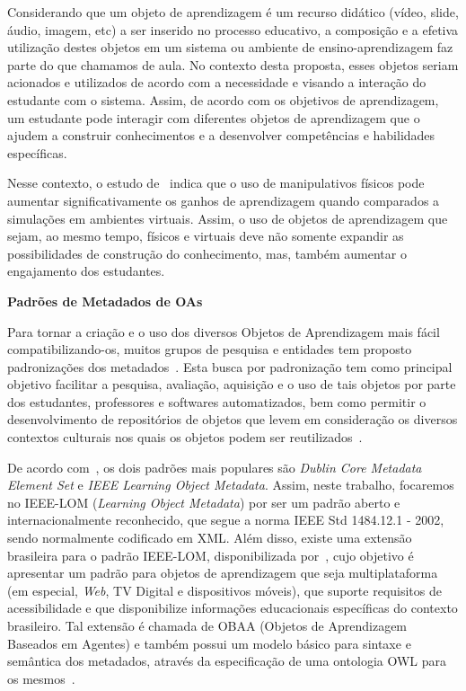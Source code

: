 Considerando que um objeto de aprendizagem é um recurso didático (vídeo, slide, áudio, imagem, etc) a ser inserido no processo educativo, a composição e a efetiva utilização destes objetos em um sistema ou ambiente de ensino-aprendizagem faz parte do que chamamos de aula. No contexto desta proposta, esses objetos seriam acionados e utilizados de acordo com a necessidade e visando a interação do estudante com o sistema. Assim, %
de acordo com os objetivos de aprendizagem, um estudante pode interagir com diferentes objetos de aprendizagem que o ajudem a construir conhecimentos e a desenvolver competências e habilidades específicas.

Nesse contexto, o estudo de~\cite{Salehi:2014} indica que o uso de manipulativos físicos pode aumentar significativamente os ganhos de aprendizagem quando comparados a simulações em ambientes virtuais. Assim, o uso de objetos de aprendizagem que sejam, ao mesmo tempo, físicos e virtuais deve não somente expandir as possibilidades de construção do conhecimento, mas, também aumentar o engajamento dos estudantes.

\textbf{Padrões de Metadados de OAs}

Para tornar a criação e o uso dos diversos Objetos de Aprendizagem mais fácil compatibilizando-os, muitos grupos de pesquisa e entidades tem proposto padronizações dos metadados~\citep{vicari:2009}. Esta busca por padronização tem como principal objetivo facilitar a pesquisa, avaliação, aquisição e o uso de tais objetos por parte dos estudantes, professores e softwares automatizados, bem como permitir o desenvolvimento de repositórios de objetos que levem em consideração os diversos contextos culturais nos quais os objetos podem ser reutilizados~\citep{learning2002ieee}.

De acordo com~\cite{mcclelland:2003}, os dois padrões mais populares são \textit{Dublin Core Metadata Element Set} e \textit{IEEE Learning Object Metadata}. Assim, neste trabalho, focaremos no IEEE-LOM (\textit{Learning Object Metadata}) por ser um padrão aberto e internacionalmente reconhecido, que segue a norma IEEE Std 1484.12.1 - 2002, sendo normalmente codificado em XML. Além disso, existe uma extensão brasileira para o padrão IEEE-LOM, disponibilizada por~\cite{vicari:2009}, cujo  objetivo é apresentar um padrão para objetos de aprendizagem que seja multiplataforma (em especial, \textit{Web}, TV Digital e dispositivos móveis), que suporte requisitos de acessibilidade e que disponibilize informações educacionais específicas do contexto brasileiro. Tal extensão é chamada de OBAA (Objetos de Aprendizagem Baseados em Agentes) e também possui um modelo básico para sintaxe e semântica dos metadados, através da especificação de uma ontologia OWL para os mesmos~\citep{vicari:2009}.

